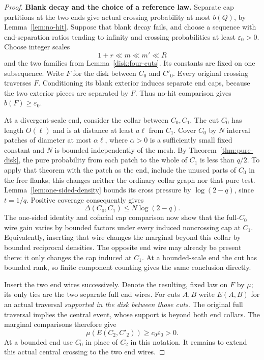 \begin{proof}
\textbf{Blank decay and the choice of a reference law.}\quad
Separate cap partitions at the two ends give actual crossing
probability at most $b(Q)$, by Lemma~\ref{lem:no-hit}.  Suppose that
blank decay fails, and choose a sequence with end-separation ratios
tending to infinity and crossing probabilities at least $\varepsilon_0>0$.
Choose integer scales
\[
 1+r\ll m\ll m'\ll R
\]
and the two families from Lemma~\ref{disk:four-cuts}.  Its constants
are fixed on one subsequence.  Write $F$ for the disk between $C_0$
and $C'_0$.  Every original crossing traverses $F$.  Conditioning its
blank exterior induces separate end caps, because the two exterior
pieces are separated by $F$.  Thus no-hit comparison gives
$b(F)\ge\varepsilon_0$.

At a divergent-scale end, consider the collar between $C_0,C_1$.
The cut $C_0$ has length $O(\ell)$ and is at distance at least
$a\ell$ from $C_1$.  Cover $C_0$ by $N$ interval patches of diameter
at most $\alpha\ell$, where $\alpha>0$ is a sufficiently small fixed
constant and $N$ is bounded independently of the mesh.  By
Theorem~\ref{thm:pure-disk}, the pure probability from each patch to
the whole of $C_1$ is less than $q/2$.  To apply that theorem with the
patch as the end, include the unused parts of $C_0$ in the free flanks;
this changes neither the ordinary collar graph nor that pure test.
Lemma~\ref{lem:one-sided-density} bounds its cross pressure by
$\log(2-q)$, since $t=1/q$.  Positive coverage consequently gives
\begin{equation}\label{disk:end-pressure}
 \Delta(C_0,C_1)\le N\log(2-q).
\end{equation}
The one-sided identity and cofacial cap comparison now show that the
full-$C_0$ wire gain varies by bounded factors under every induced
noncrossing cap at $C_1$.  Equivalently, inserting that wire changes
the marginal beyond this collar by bounded reciprocal densities.
The opposite end wire may already be present there: it only changes
the cap induced at $C_1$.  At a bounded-scale end the cut has bounded
rank, so finite component counting gives the same conclusion directly.

Insert the two end wires successively.  Denote the resulting, fixed law
on $F$ by $\mu$; its only ties are the two separate full end wires.
For cuts $A,B$ write $E(A,B)$ for an actual traversal \emph{supported
in the disk between those cuts}.  The original full traversal implies
the central event, whose support is beyond both end collars.  The
marginal comparisons therefore give
\begin{equation}\label{disk:central-positive}
 \mu(E(C_2,C'_2))\ge c_0\varepsilon_0>0.
\end{equation}
At a bounded end use $C_0$ in place of $C_2$ in this notation.  It
remains to extend this actual central crossing to the two end wires.


\end{proof}
